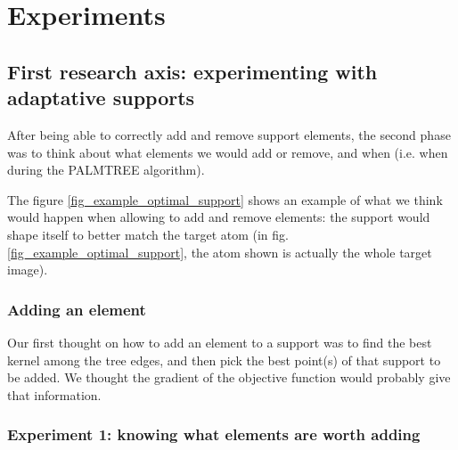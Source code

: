 \chapter{Experiments}

\section{First research axis: experimenting with adaptative supports}

After being able to correctly add and remove support elements, the second phase was to think about what elements we would add or remove, and when (i.e. when during the PALMTREE algorithm).

The figure \ref{fig_example_optimal_support} shows an example of what we think would happen when allowing to add and remove elements: the support would shape itself to better match the target atom (in fig.\ref{fig_example_optimal_support}, the atom shown is actually the whole target image).


\subsection{Adding an element}
Our first thought on how to add an element to a support was to find the best kernel among the tree edges, and then pick the best point(s) of that support to be added. We thought the gradient of the objective function would probably give that information. 


\subsection{Experiment 1: knowing what elements are worth adding}

